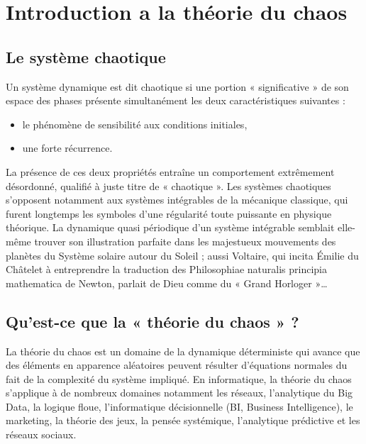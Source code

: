 \documentclass[10pt,a4paper]{article}
\begin{document}
\tableofcontents
\listoffigures
\listoftables

\section{Introduction a la théorie du chaos}
\subsection{Le système chaotique}

Un système dynamique est dit chaotique si une portion « significative » de son espace des phases présente simultanément les deux caractéristiques suivantes :

\begin{itemize}
\item le phénomène de sensibilité aux conditions initiales,
\item une forte récurrence.
\end{itemize}

La présence de ces deux propriétés entraîne un comportement extrêmement désordonné, qualifié à juste titre de « chaotique ». Les systèmes chaotiques s'opposent notamment aux systèmes intégrables de la mécanique classique, qui furent longtemps les symboles d'une régularité toute puissante en physique théorique. La dynamique quasi périodique d'un système intégrable semblait elle-même trouver son illustration parfaite dans les majestueux mouvements des planètes du Système solaire autour du Soleil ; aussi Voltaire, qui incita Émilie du Châtelet à entreprendre la traduction des Philosophiae naturalis principia mathematica de Newton, parlait de Dieu comme du « Grand Horloger »…

\subsection{Qu'est-ce que la « théorie du chaos » ?}

La théorie du chaos est un domaine de la dynamique déterministe qui avance que des éléments en apparence aléatoires peuvent résulter d'équations normales du fait de la complexité du système impliqué. En informatique, la théorie du chaos s'applique à de nombreux domaines notamment les réseaux, l'analytique du Big Data, la logique floue, l'informatique décisionnelle (BI, Business Intelligence), le marketing, la théorie des jeux, la pensée systémique, l'analytique prédictive et les réseaux sociaux.\vspace{0.40cm}
\end{document}
